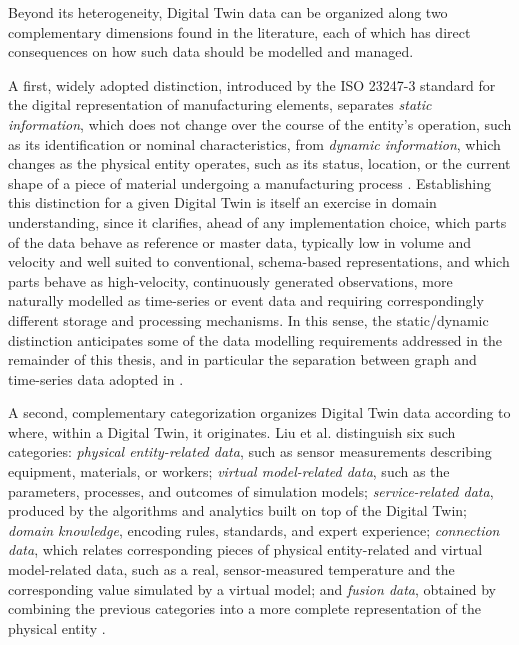 Beyond its heterogeneity, Digital Twin data can be organized along two complementary dimensions found in the literature, each of which has direct consequences on how such data should be modelled and managed.

A first, widely adopted distinction, introduced by the ISO 23247-3 standard for the digital representation of manufacturing elements, separates \emph{static information}, which does not change over the course of the entity's operation, such as its identification or nominal characteristics, from \emph{dynamic information}, which changes as the physical entity operates, such as its status, location, or the current shape of a piece of material undergoing a manufacturing process \cite{liu2022dtd}. Establishing this distinction for a given Digital Twin is itself an exercise in domain understanding, since it clarifies, ahead of any implementation choice, which parts of the data behave as reference or master data, typically low in volume and velocity and well suited to conventional, schema-based representations, and which parts behave as high-velocity, continuously generated observations, more naturally modelled as time-series or event data and requiring correspondingly different storage and processing mechanisms. In this sense, the static/dynamic distinction anticipates some of the data modelling requirements addressed in the remainder of this thesis, and in particular the separation between graph and time-series data adopted in .

A second, complementary categorization organizes Digital Twin data according to where, within a Digital Twin, it originates. Liu et al. distinguish six such categories: \emph{physical entity-related data}, such as sensor measurements describing equipment, materials, or workers; \emph{virtual model-related data}, such as the parameters, processes, and outcomes of simulation models; \emph{service-related data}, produced by the algorithms and analytics built on top of the Digital Twin; \emph{domain knowledge}, encoding rules, standards, and expert experience; \emph{connection data}, which relates corresponding pieces of physical entity-related and virtual model-related data, such as a real, sensor-measured temperature and the corresponding value simulated by a virtual model; and \emph{fusion data}, obtained by combining the previous categories into a more complete representation of the physical entity \cite{liu2022dtd}.

